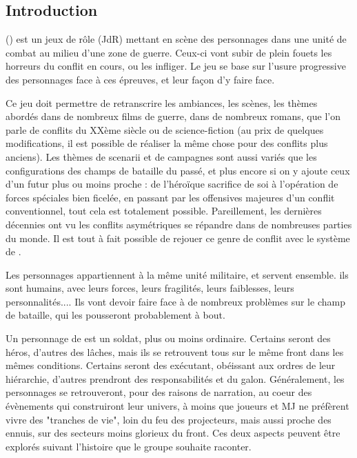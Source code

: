 \documentclass{report}
\begin{document}
\tableofcontents
\begin{multicols}{2}
\setlength{\columnsep}{0.5cm}
\setlength{\columnseprule}{0.5pt}

\chapter*{Introduction}

\nomjeu (\diminutif) est un jeux de rôle (JdR) mettant en scène des personnages dans une unité de combat au milieu d'une zone de guerre. Ceux-ci vont subir de plein fouets les horreurs du conflit en cours, ou les infliger. Le jeu se base sur l'usure progressive des personnages face à ces épreuves, et leur façon d'y faire face.


Ce jeu doit permettre de retranscrire les ambiances, les scènes, les thèmes abordés dans de nombreux films de guerre, dans de nombreux romans, que l'on parle de conflits du XXème siècle ou de science-fiction (au prix de quelques modifications, il est possible de réaliser la même chose pour des conflits plus anciens). Les thèmes de scenarii et de campagnes sont aussi variés que les configurations des champs de bataille du passé, et plus encore si on y ajoute ceux d'un futur plus ou moins proche : de l'héroïque sacrifice de soi à l'opération de forces spéciales bien ficelée, en passant par les offensives majeures d'un conflit conventionnel, tout cela est totalement possible. Pareillement, les dernières décennies ont vu les conflits asymétriques se répandre dans de nombreuses parties du monde. Il est tout à fait possible de rejouer ce genre de conflit avec le système de \diminutif.

Les personnages appartiennent à la même unité militaire, et servent ensemble. ils sont humains, avec leurs forces, leurs fragilités, leurs faiblesses, leurs personnalités.... Ils vont devoir faire face à de nombreux problèmes sur le champ de bataille, qui les pousseront probablement à bout. 

Un personnage de \nomjeu est un soldat, plus ou moins ordinaire. Certains seront des héros, d'autres des lâches, mais ils se retrouvent tous sur le même front dans les mêmes conditions. Certains seront des exécutant, obéissant aux ordres de leur hiérarchie, d'autres prendront des responsabilités et du galon. Généralement, les personnages se retrouveront, pour des raisons de narration, au coeur des évènements qui construiront leur univers, à moins que joueurs et MJ ne préfèrent vivre des "tranches de vie", loin du feu des projecteurs, mais aussi proche des ennuis, sur des secteurs moins glorieux du front. Ces deux aspects peuvent être explorés suivant l'histoire que le groupe souhaite raconter.


\end{multicols}
\end{document}
